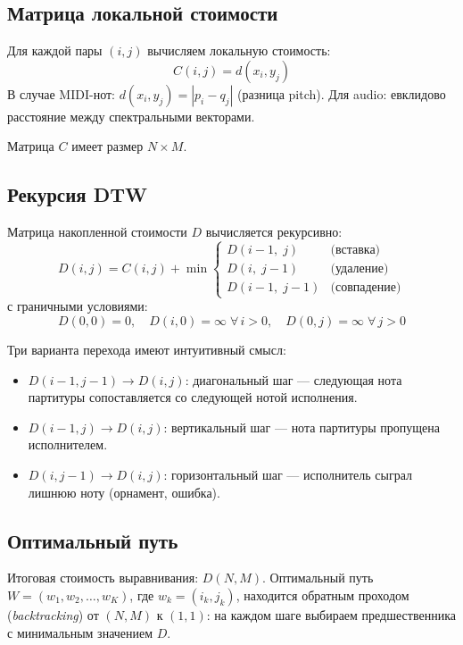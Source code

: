 \documentclass[a4paper,11pt]{article}
\begin{document}
\subsection{Матрица локальной стоимости}

Для каждой пары $(i,j)$ вычисляем локальную стоимость:
\[
  C(i,j) = d(x_i, y_j)
\]
В случае MIDI-нот: $d(x_i, y_j) = |p_i - q_j|$ (разница pitch).
Для audio: евклидово расстояние между спектральными векторами.

Матрица $C$ имеет размер $N \times M$.

\subsection{Рекурсия DTW}

\begin{formulabox}[title={Рекурсия DTW}]
Матрица накопленной стоимости $D$ вычисляется рекурсивно:
\[
  D(i,j) = C(i,j) + \min
  \begin{cases}
    D(i-1,\; j)   & \text{(вставка)} \\
    D(i,\; j-1)   & \text{(удаление)} \\
    D(i-1,\; j-1) & \text{(совпадение)}
  \end{cases}
\]
с граничными условиями:
\[
  D(0,0) = 0, \quad D(i,0) = \infty \;\forall\, i > 0, \quad D(0,j) = \infty \;\forall\, j > 0
\]
\end{formulabox}

Три варианта перехода имеют интуитивный смысл:
\begin{itemize}[leftmargin=2em]
  \item $D(i-1, j-1) \to D(i,j)$: диагональный шаг --- следующая нота
        партитуры сопоставляется со следующей нотой исполнения.
  \item $D(i-1, j) \to D(i,j)$: вертикальный шаг --- нота партитуры
        пропущена исполнителем.
  \item $D(i, j-1) \to D(i,j)$: горизонтальный шаг --- исполнитель
        сыграл лишнюю ноту (орнамент, ошибка).
\end{itemize}

\subsection{Оптимальный путь}

Итоговая стоимость выравнивания: $D(N, M)$.
Оптимальный путь $W = (w_1, w_2, \ldots, w_K)$, где $w_k = (i_k, j_k)$,
находится обратным проходом (\emph{backtracking}) от $(N,M)$ к $(1,1)$:
на каждом шаге выбираем предшественника с минимальным значением $D$.
\end{document}
